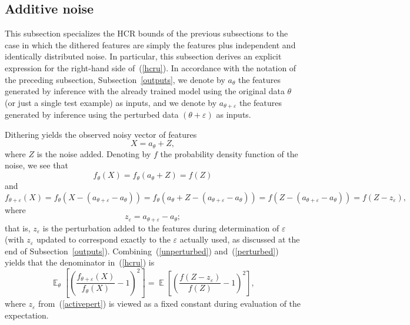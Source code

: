 \documentclass[]{fairmeta}
\DeclareMathOperator{\E}{\mathop{}\mathbb{E}}
\renewcommand{\epsilon}{\varepsilon}
\begin{document}
\subsection{Additive noise}
\label{additive}

This subsection specializes the HCR bounds of the previous subsections
to the case in which the dithered features are simply the features
plus independent and identically distributed noise.
In particular, this subsection derives an explicit expression
for the right-hand side of~(\ref{hcru}).
In accordance with the notation of the preceding subsection,
Subsection~\ref{outputs},
we denote by $a_{\theta}$ the features generated by inference
with the already trained model using the original data $\theta$
(or just a single test example) as inputs,
and we denote by $a_{\theta + \epsilon}$ the features generated by inference
using the perturbed data $(\theta + \epsilon)$ as inputs.

Dithering yields the observed noisy vector of features
%
\begin{equation}
X = a_{\theta} + Z,
\end{equation}
%
where $Z$ is the noise added.
Denoting by $f$ the probability density function of the noise, we see that
%
\begin{equation}
\label{unperturbed}
f_{\theta}(X) = f_{\theta}(a_{\theta} + Z) = f(Z)
\end{equation}
%
and
%
\begin{equation}
\label{perturbed}
f_{\theta + \epsilon}(X) = f_{\theta}(X - (a_{\theta + \epsilon} - a_{\theta}))
= f_{\theta}(a_{\theta} + Z - (a_{\theta + \epsilon} - a_{\theta}))
= f(Z - (a_{\theta + \epsilon} - a_{\theta}))
= f(Z - z_{\epsilon}),
\end{equation}
%
where
%
\begin{equation}
\label{activepert}
z_{\epsilon} = a_{\theta + \epsilon} - a_{\theta};
\end{equation}
%
that is, $z_{\epsilon}$ is the perturbation added to the features
during determination of $\epsilon$ (with $z_{\epsilon}$ updated
to correspond exactly to the $\epsilon$ actually used,
as discussed at the end of Subsection~\ref{outputs}).
Combining~(\ref{unperturbed}) and~(\ref{perturbed}) yields that
the denominator in~(\ref{hcru}) is
%
\begin{equation}
\label{denom}
\E_{\theta}\left[\left(
           \frac{f_{\theta + \epsilon}(X)}{f_{\theta}(X)} - 1\right)^2 \right]
= \E\left[\left( \frac{f(Z-z_{\epsilon})}{f(Z)} - 1\right)^2 \right],
\end{equation}
%
where $z_{\epsilon}$ from~(\ref{activepert}) is viewed
as a fixed constant during evaluation of the expectation.
\end{document}
